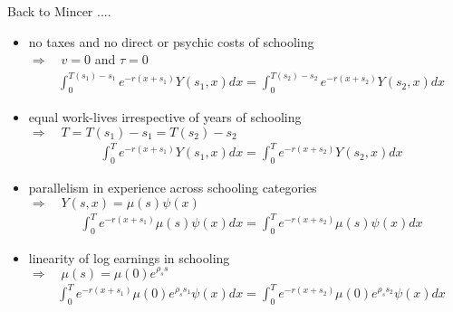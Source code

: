 \begin{frame}
Back to Mincer ....

\begin{itemize}
\item no taxes and no direct or psychic costs of schooling \\\vspace{0.3cm}
\hspace{0.3cm}$\Rightarrow\quad v = 0$ and $\tau = 0$\vspace{0.3cm}
\begin{align*}
&\int_{0}^{T(s_1) - s_1} e^{-r(x + s_1)}Y(s_1, x) dx  = \int_{0}^{T(s_2) - s_2} e^{-r(x + s_2)}Y(s_2, x) dx
\end{align*}
\end{itemize}\end{frame}

\begin{frame}
\begin{itemize}
\item equal work-lives irrespective of years of schooling \\\vspace{0.3cm}
\hspace{0.3cm}$\Rightarrow\quad T = T(s_1) - s_1 = T(s_2) - s_2$\vspace{0.3cm}
\begin{align*}
&\int_{0}^T e^{-r(x + s_1)}Y(s_1, x) dx  = \int_{0}^T e^{-r(x + s_2)}Y(s_2, x) dx
\end{align*}
\end{itemize}
\end{frame}

\begin{frame}
\begin{itemize}
\item parallelism in experience across schooling categories \\\vspace{0.3cm}
\hspace{0.3cm}$\Rightarrow\quad Y(s, x) = \mu(s)\psi(x)$\vspace{0.3cm}
\begin{align*}
&\int_{0}^T e^{-r(x + s_1)} \mu(s)\psi(x) dx  = \int_{0}^T e^{-r(x + s_2)} \mu(s)\psi(x)dx
\end{align*}
\end{itemize}
\end{frame}


\begin{frame}
\begin{itemize}
\item linearity of log earnings in schooling \\\vspace{0.3cm}
\hspace{0.3cm}$\Rightarrow\quad \mu(s) = \mu(0)e^{\rho_s s}$\vspace{0.3cm}
\begin{align*}
&\int_{0}^T e^{-r(x + s_1)} \mu(0)e^{\rho_s s_1}\psi(x) dx  = \int_{0}^T e^{-r(x + s_2)} \mu(0)e^{\rho_s s_2}\psi(x)dx
\end{align*}
\end{itemize}
\end{frame}

